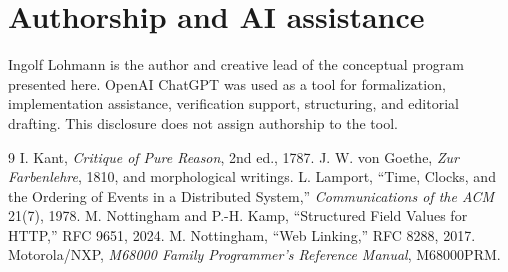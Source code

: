 \documentclass[11pt,a4paper]{article}
\begin{document}
\section*{Authorship and AI assistance}
Ingolf Lohmann is the author and creative lead of the conceptual program presented here. OpenAI ChatGPT was used as a tool for formalization, implementation assistance, verification support, structuring, and editorial drafting. This disclosure does not assign authorship to the tool.

\begin{thebibliography}{9}
 I. Kant, \emph{Critique of Pure Reason}, 2nd ed., 1787.
 J. W. von Goethe, \emph{Zur Farbenlehre}, 1810, and morphological writings.
 L. Lamport, ``Time, Clocks, and the Ordering of Events in a Distributed System,'' \emph{Communications of the ACM} 21(7), 1978.
 M. Nottingham and P.-H. Kamp, ``Structured Field Values for HTTP,'' RFC 9651, 2024.
 M. Nottingham, ``Web Linking,'' RFC 8288, 2017.
 Motorola/NXP, \emph{M68000 Family Programmer's Reference Manual}, M68000PRM.
\end{thebibliography}
\end{document}

